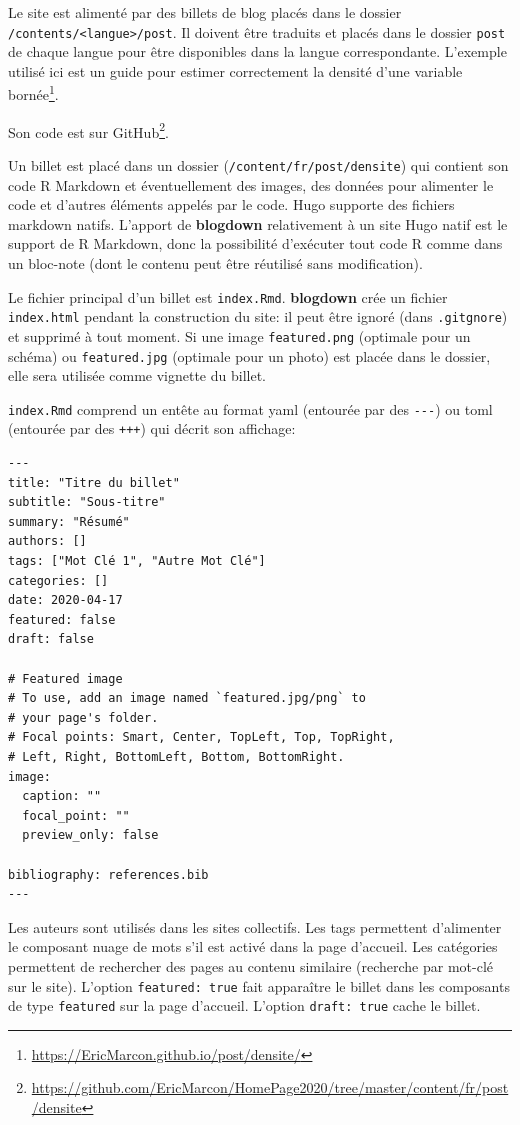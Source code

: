 \documentclass[
  12pt,
  french,
  a4paper,
  extrafontsizes,onecolumn,openright
  ]{memoir}
\begin{document}
Le site est alimenté par des billets de blog placés dans le dossier \texttt{/contents/\textless{}langue\textgreater{}/post}.
Il doivent être traduits et placés dans le dossier \texttt{post} de chaque langue pour être disponibles dans la langue correspondante.
L'exemple utilisé ici est un guide pour estimer correctement la densité d'une variable bornée\footnote{\url{https://EricMarcon.github.io/post/densite/}}.

Son code est sur GitHub\footnote{\url{https://github.com/EricMarcon/HomePage2020/tree/master/content/fr/post/densite}}.

Un billet est placé dans un dossier (\texttt{/content/fr/post/densite}) qui contient son code R Markdown et éventuellement des images, des données pour alimenter le code et d'autres éléments appelés par le code.
Hugo supporte des fichiers markdown natifs.
L'apport de \textbf{blogdown} relativement à un site Hugo natif est le support de R Markdown, donc la possibilité d'exécuter tout code R comme dans un bloc-note (dont le contenu peut être réutilisé sans modification).

Le fichier principal d'un billet est \texttt{index.Rmd}.
\textbf{blogdown} crée un fichier \texttt{index.html} pendant la construction du site: il peut être ignoré (dans \texttt{.gitgnore}) et supprimé à tout moment.
Si une image \texttt{featured.png} (optimale pour un schéma) ou \texttt{featured.jpg} (optimale pour un photo) est placée dans le dossier, elle sera utilisée comme vignette du billet.

\texttt{index.Rmd} comprend un entête au format yaml (entourée par des \texttt{-\/-\/-}) ou toml (entourée par des \texttt{+++}) qui décrit son affichage:

\begin{verbatim}
---
title: "Titre du billet"
subtitle: "Sous-titre"
summary: "Résumé"
authors: []
tags: ["Mot Clé 1", "Autre Mot Clé"]
categories: []
date: 2020-04-17
featured: false
draft: false

# Featured image
# To use, add an image named `featured.jpg/png` to 
# your page's folder.
# Focal points: Smart, Center, TopLeft, Top, TopRight,
# Left, Right, BottomLeft, Bottom, BottomRight.
image:
  caption: ""
  focal_point: ""
  preview_only: false
  
bibliography: references.bib
---
\end{verbatim}

Les auteurs sont utilisés dans les sites collectifs.
Les tags permettent d'alimenter le composant nuage de mots s'il est activé dans la page d'accueil.
Les catégories permettent de rechercher des pages au contenu similaire (recherche par mot-clé sur le site).
L'option \texttt{featured:\ true} fait apparaître le billet dans les composants de type \texttt{featured} sur la page d'accueil.
L'option \texttt{draft:\ true} cache le billet.
\end{document}
